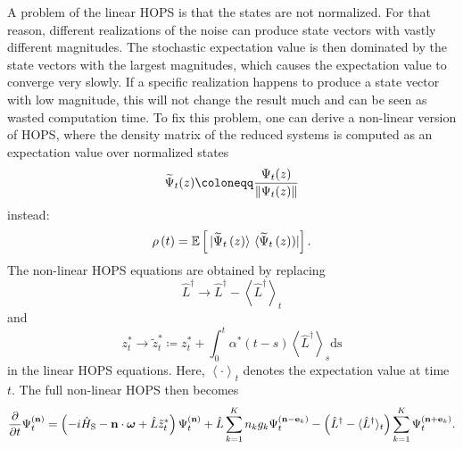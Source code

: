 A problem of the linear HOPS is that the states are not normalized. For that reason, different realizations of the noise can
produce state vectors with vastly different magnitudes. The stochastic expectation value is then dominated by the state vectors
with the largest magnitudes, which causes the expectation value to converge very slowly.
If a specific realization happens to produce a state vector with low magnitude, this will not change the result much and can be seen
as wasted computation time. To fix this problem, one can derive a non-linear version of HOPS, where the density matrix of the
reduced systems is computed as an expectation value over normalized states
\begin{equation*}
    \widetilde{\Psi}_t(z) \coloneqq \frac{\Psi_t(z)}{\norm{\Psi_t(z)}}
\end{equation*}
instead:
\begin{equation}
    \label{eq:averaging_states_nonlinear}
    \rho\left(t\right) = \mathbb{E}\left[\ket*{\widetilde{\Psi}_t\left(z\right)}\bra*{\widetilde{\Psi}_t\left(z)\right)}\right].
\end{equation}
 The non-linear HOPS equations are obtained by replacing \cite{Diosi:1998}
\begin{equation*}
    \hat{L}^\dagger \rightarrow \hat{L}^\dagger - \left\langle
        \hat{L}^\dagger
    \right\rangle_t
\end{equation*}
and
\begin{equation}
    \label{eq:memory_term_nonlinear_HOPS}
    z_t^* \rightarrow \tilde{z}_t^* \coloneqq z_t^* + \int_0^t \alpha^*(t-s) \left\langle
        \hat{L}^\dagger
    \right\rangle_s \text{ds}
\end{equation}
in the linear HOPS equations. Here, $\left\langle \cdot \right\rangle_t$ denotes the expectation value at time $t$.
The full non-linear HOPS then becomes
\begin{equation}
    \label{eq:non_linear_HOPS_single_site}
    \frac{\partial}{\partial t}\Psi_t^{(\vectorbold{n})} = \left(
        -i\hat{H}_\text{S} - \vectorbold{n}\cdot\boldsymbol{\omega} + \hat{L}\tilde{z}_t^*
    \right) \Psi_t^{(\vectorbold{n})}
    + \hat{L}\sum_{k=1}^{K}n_kg_k\Psi_t^{(\vectorbold{n}-\vectorbold{e}_k)}
    - \left(
        \hat{L}^\dagger - \langle
        \hat{L}^\dagger
    \rangle_t
    \right)\sum_{k=1}^{K}\Psi_t^{(\vectorbold{n}+\vectorbold{e}_k)}.
\end{equation}